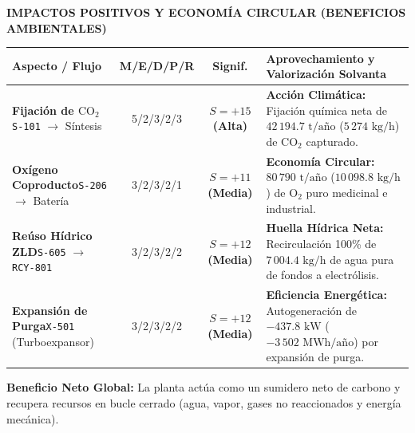 \documentclass[10pt,landscape]{article}
\newcommand{\badgegreen}[1]{\colorbox{badgegreen}{\textbf{\color{emeraldgreen}\fontsize{6.8pt}{8pt}\selectfont #1}}}
\begin{document}
\hfill
\begin{minipage}[t]{0.492\textwidth}
  \begin{tcolorbox}[
    colback=white,
    colframe=emeraldgreen!80!black,
    arc=1.5mm,
    boxrule=0.75pt,
    top=2.0pt,
    bottom=2.0pt,
    left=3pt,
    right=3pt,
    height=6.15cm
  ]
    \begin{tcolorbox}[colback=emeraldgreen!90!black,colframe=emeraldgreen!90!black,arc=1.0mm,boxrule=0pt,top=1.5pt,bottom=1.5pt,left=2pt,right=2pt]
      \centering
      {\color{white}\fontsize{6.8pt}{8.0pt}\selectfont \textbf{IMPACTOS POSITIVOS Y ECONOMÍA CIRCULAR (BENEFICIOS AMBIENTALES)}}
    \end{tcolorbox}
    \vspace{1.5pt}
    \fontsize{4.6pt}{5.6pt}\selectfont
    \renewcommand{\arraystretch}{1.12}
    \begin{tabularx}{\linewidth}{p{2.35cm} c c X}
      \toprule
      \rowcolor{tableheader}
      \textbf{\color{white}Aspecto / Flujo} & \textbf{\color{white}M/E/D/P/R} & \textbf{\color{white}Signif.} & \textbf{\color{white}Aprovechamiento y Valorización Solvanta} \\
      \midrule
      \rowcolor{roweven}
      \textbf{Fijación de $\text{CO}_2$}\newline\texttt{S-101} $\to$ Síntesis & 5/2/3/2/3 & \badgegreen{$S=+15$ (Alta)} & \textbf{Acción Climática:} Fijación química neta de $42\,194.7\text{ t/año}$ ($5\,274\text{ kg/h}$) de $\text{CO}_2$ capturado. \\
      \rowcolor{rowodd}
      \textbf{Oxígeno Coproducto}\newline\texttt{S-206} $\to$ Batería & 3/2/3/2/1 & \badgegreen{$S=+11$ (Media)} & \textbf{Economía Circular:} $80\,790\text{ t/año}$ ($10\,098.8\text{ kg/h}$) de $\text{O}_2$ puro medicinal e industrial. \\
      \rowcolor{roweven}
      \textbf{Reúso Hídrico ZLD}\newline\texttt{S-605} $\to$ \texttt{RCY-801} & 3/2/3/2/2 & \badgegreen{$S=+12$ (Media)} & \textbf{Huella Hídrica Neta:} Recirculación 100\% de $7\,004.4\text{ kg/h}$ de agua pura de fondos a electrólisis. \\
      \rowcolor{rowodd}
      \textbf{Expansión de Purga}\newline\texttt{X-501} (Turboexpansor) & 3/2/3/2/2 & \badgegreen{$S=+12$ (Media)} & \textbf{Eficiencia Energética:} Autogeneración de $-437.8\text{ kW}$ ($-3\,502\text{ MWh/año}$) por expansión de purga. \\
      \bottomrule
    \end{tabularx}
    \vspace{2pt}
    \begin{tcolorbox}[colback=emeraldgreen!6,colframe=emeraldgreen!25,arc=1.0mm,boxrule=0.5pt,top=1.5pt,bottom=1.5pt,left=3pt,right=3pt]
      \fontsize{4.6pt}{5.6pt}\selectfont
      \textbf{\color{emeraldgreen!90!black}Beneficio Neto Global:} La planta actúa como un sumidero neto de carbono y recupera recursos en bucle cerrado (agua, vapor, gases no reaccionados y energía mecánica).
    \end{tcolorbox}
  \end{tcolorbox}
\end{minipage}
\end{document}
